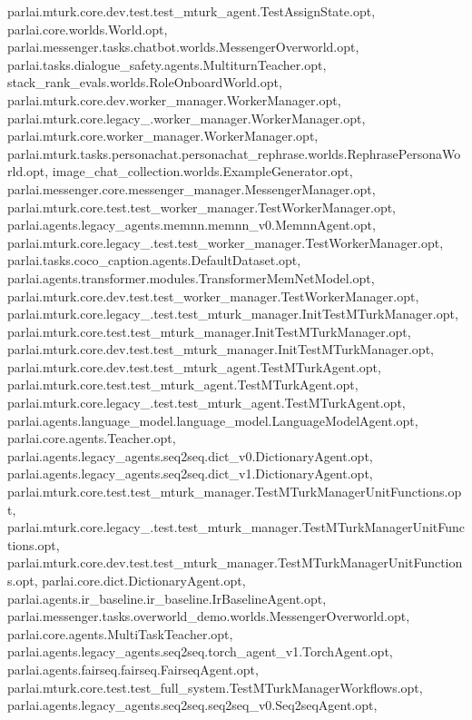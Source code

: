 parlai.\+mturk.\+core.\+dev.\+test.\+test\+\_\+mturk\+\_\+agent.\+Test\+Assign\+State.\+opt, parlai.\+core.\+worlds.\+World.\+opt, parlai.\+messenger.\+tasks.\+chatbot.\+worlds.\+Messenger\+Overworld.\+opt, parlai.\+tasks.\+dialogue\+\_\+safety.\+agents.\+Multiturn\+Teacher.\+opt, stack\+\_\+rank\+\_\+evals.\+worlds.\+Role\+Onboard\+World.\+opt, parlai.\+mturk.\+core.\+dev.\+worker\+\_\+manager.\+Worker\+Manager.\+opt, parlai.\+mturk.\+core.\+legacy\+\_.\+worker\+\_\+manager.\+Worker\+Manager.\+opt, parlai.\+mturk.\+core.\+worker\+\_\+manager.\+Worker\+Manager.\+opt, parlai.\+mturk.\+tasks.\+personachat.\+personachat\+\_\+rephrase.\+worlds.\+Rephrase\+Persona\+World.\+opt, image\+\_\+chat\+\_\+collection.\+worlds.\+Example\+Generator.\+opt, parlai.\+messenger.\+core.\+messenger\+\_\+manager.\+Messenger\+Manager.\+opt, parlai.\+mturk.\+core.\+test.\+test\+\_\+worker\+\_\+manager.\+Test\+Worker\+Manager.\+opt, parlai.\+agents.\+legacy\+\_\+agents.\+memnn.\+memnn\+\_\+v0.\+Memnn\+Agent.\+opt, parlai.\+mturk.\+core.\+legacy\+\_.\+test.\+test\+\_\+worker\+\_\+manager.\+Test\+Worker\+Manager.\+opt, parlai.\+tasks.\+coco\+\_\+caption.\+agents.\+Default\+Dataset.\+opt, parlai.\+agents.\+transformer.\+modules.\+Transformer\+Mem\+Net\+Model.\+opt, parlai.\+mturk.\+core.\+dev.\+test.\+test\+\_\+worker\+\_\+manager.\+Test\+Worker\+Manager.\+opt, parlai.\+mturk.\+core.\+legacy\+\_.\+test.\+test\+\_\+mturk\+\_\+manager.\+Init\+Test\+M\+Turk\+Manager.\+opt, parlai.\+mturk.\+core.\+test.\+test\+\_\+mturk\+\_\+manager.\+Init\+Test\+M\+Turk\+Manager.\+opt, parlai.\+mturk.\+core.\+dev.\+test.\+test\+\_\+mturk\+\_\+manager.\+Init\+Test\+M\+Turk\+Manager.\+opt, parlai.\+mturk.\+core.\+dev.\+test.\+test\+\_\+mturk\+\_\+agent.\+Test\+M\+Turk\+Agent.\+opt, parlai.\+mturk.\+core.\+test.\+test\+\_\+mturk\+\_\+agent.\+Test\+M\+Turk\+Agent.\+opt, parlai.\+mturk.\+core.\+legacy\+\_.\+test.\+test\+\_\+mturk\+\_\+agent.\+Test\+M\+Turk\+Agent.\+opt, parlai.\+agents.\+language\+\_\+model.\+language\+\_\+model.\+Language\+Model\+Agent.\+opt, parlai.\+core.\+agents.\+Teacher.\+opt, parlai.\+agents.\+legacy\+\_\+agents.\+seq2seq.\+dict\+\_\+v0.\+Dictionary\+Agent.\+opt, parlai.\+agents.\+legacy\+\_\+agents.\+seq2seq.\+dict\+\_\+v1.\+Dictionary\+Agent.\+opt, parlai.\+mturk.\+core.\+test.\+test\+\_\+mturk\+\_\+manager.\+Test\+M\+Turk\+Manager\+Unit\+Functions.\+opt, parlai.\+mturk.\+core.\+legacy\+\_.\+test.\+test\+\_\+mturk\+\_\+manager.\+Test\+M\+Turk\+Manager\+Unit\+Functions.\+opt, parlai.\+mturk.\+core.\+dev.\+test.\+test\+\_\+mturk\+\_\+manager.\+Test\+M\+Turk\+Manager\+Unit\+Functions.\+opt, parlai.\+core.\+dict.\+Dictionary\+Agent.\+opt, parlai.\+agents.\+ir\+\_\+baseline.\+ir\+\_\+baseline.\+Ir\+Baseline\+Agent.\+opt, parlai.\+messenger.\+tasks.\+overworld\+\_\+demo.\+worlds.\+Messenger\+Overworld.\+opt, parlai.\+core.\+agents.\+Multi\+Task\+Teacher.\+opt, parlai.\+agents.\+legacy\+\_\+agents.\+seq2seq.\+torch\+\_\+agent\+\_\+v1.\+Torch\+Agent.\+opt, parlai.\+agents.\+fairseq.\+fairseq.\+Fairseq\+Agent.\+opt, parlai.\+mturk.\+core.\+test.\+test\+\_\+full\+\_\+system.\+Test\+M\+Turk\+Manager\+Workflows.\+opt, parlai.\+agents.\+legacy\+\_\+agents.\+seq2seq.\+seq2seq\+\_\+v0.\+Seq2seq\+Agent.\+opt, 